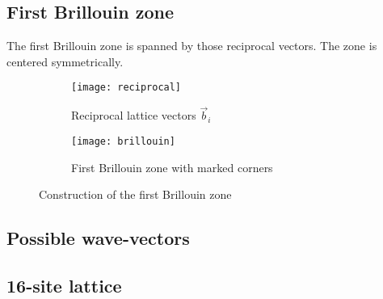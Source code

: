 \documentclass[11pt, english, fleqn, DIV=15, headinclude, BCOR=1cm]{scrartcl}
\begin{document}
\subsection{First Brillouin zone}

The first Brillouin zone is spanned by those reciprocal vectors. The zone is
centered symmetrically.

\begin{figure}[htbp]
    \begin{subfigure}[b]{0.5\linewidth}
        \centering
        \texttt{[image: reciprocal]}
        \caption{%
            Reciprocal lattice vectors $\vec b_i$
        }
        \label{fig:}
    \end{subfigure}
    \begin{subfigure}[b]{0.5\linewidth}
        \centering
        \texttt{[image: brillouin]}
        \caption{%
            First Brillouin zone with marked corners
        }
        \label{fig:}
    \end{subfigure}
    \caption{%
        Construction of the first Brillouin zone
    }
    \label{fig:}
\end{figure}

\subsection{Possible wave-vectors}

\subsection{16-site lattice}
\end{document}
